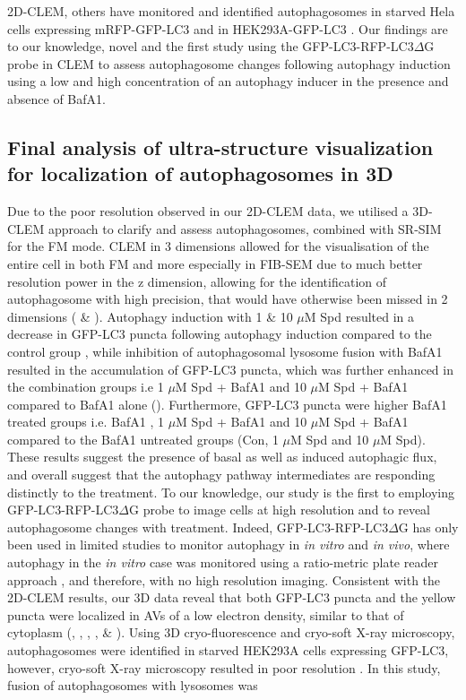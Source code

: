 2D-CLEM, others have monitored and identified autophagosomes in starved Hela cells expressing mRFP-GFP-LC3 \citep{Gudmundsson2019} and in HEK293A-GFP-LC3 \citep{Razi2009}. Our findings are to our knowledge, novel and the first study using the GFP-LC3-RFP-LC3$\Delta$G probe in CLEM to assess autophagosome changes following autophagy induction using a low and high concentration  of an autophagy inducer in the presence and absence of BafA1.

\subsection{Final analysis of ultra-structure visualization for localization of autophagosomes in 3D}
Due to the poor resolution observed in our 2D-CLEM data, we utilised a  3D-CLEM approach to clarify and assess autophagosomes, combined with SR-SIM for the FM mode. CLEM in 3 dimensions allowed for the visualisation of the entire cell in both FM and more especially in FIB-SEM due to much better resolution power in the z dimension, allowing for the identification of autophagosome with high precision, that would have otherwise been missed in 2 dimensions ( \& ). Autophagy induction with 1 \& 10 $\mu$M Spd resulted in a decrease in GFP-LC3 puncta following autophagy induction compared to the control group , while inhibition of autophagosomal lysosome fusion with BafA1 resulted in the accumulation of GFP-LC3 puncta, which was further enhanced in the combination groups i.e 1 $\mu$M Spd + BafA1 and 10 $\mu$M Spd + BafA1 compared to BafA1 alone (). Furthermore, GFP-LC3 puncta were higher BafA1 treated groups i.e. BafA1 , 1 $\mu$M Spd + BafA1 and 10 $\mu$M Spd + BafA1 compared to the BafA1 untreated groups (Con, 1 $\mu$M Spd and 10 $\mu$M Spd). These results suggest the presence of basal as well as induced autophagic flux, and overall suggest that the autophagy pathway intermediates are responding distinctly to the treatment. To our knowledge, our study is the first to employing GFP-LC3-RFP-LC3$\Delta$G probe to image cells at high resolution and to reveal autophagosome changes with treatment. Indeed, GFP-LC3-RFP-LC3$\Delta$G has only been used in limited studies to monitor autophagy in \textit{in vitro} and \textit{in vivo}, where autophagy in the \textit{in vitro} case was monitored using a ratio-metric plate reader approach \citep{Kaizuka2016}, and therefore, with no high resolution imaging. Consistent with the 2D-CLEM results, our 3D data reveal that both GFP-LC3 puncta and the yellow puncta were localized in AVs of a low electron density, similar to that of cytoplasm (, , , ,  \& ). Using 3D cryo-fluorescence and cryo-soft X-ray microscopy, autophagosomes were identified in starved HEK293A cells expressing GFP-LC3, however, cryo-soft X-ray microscopy resulted in poor resolution \citep{Duke2014}. In this study, fusion of autophagosomes with lysosomes was 